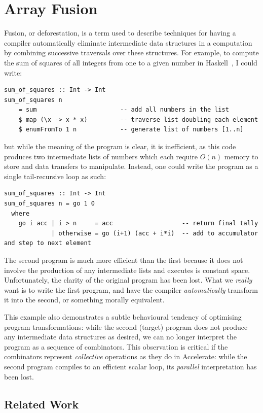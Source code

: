 \section{Array Fusion}
\label{sec:fusion}

Fusion, or deforestation, is a term used to describe techniques for having a
compiler automatically eliminate intermediate data structures in a computation
by combining successive traversals over these structures. For example, to
compute the sum of squares of all integers from one to a given number in
Haskell~\cite{Haskell:1998}, I could write:
%
\begin{lstlisting}[style=haskell]
sum_of_squares :: Int -> Int
sum_of_squares n
    = sum                       -- add all numbers in the list
    $ map (\x -> x * x)         -- traverse list doubling each element
    $ enumFromTo 1 n            -- generate list of numbers [1..n]
\end{lstlisting}
%
but while the meaning of the program is clear, it is inefficient, as this code
produces two intermediate lists of numbers which each require $O(n)$ memory to
store and data transfers to manipulate. Instead, one could write the program
as a single tail-recursive loop as such:
%
\begin{lstlisting}[style=haskell]
sum_of_squares :: Int -> Int
sum_of_squares n = go 1 0
  where
    go i acc | i > n     = acc                   -- return final tally
             | otherwise = go (i+1) (acc + i*i)  -- add to accumulator and step to next element
\end{lstlisting}
%
The second program is much more efficient than the first because it does not
involve the production of any intermediate lists and executes is constant space.
Unfortunately, the clarity of the original program has been lost. What we
\emph{really} want is to write the first program, and have the compiler
\emph{automatically} transform it into the second, or something morally
equivalent.

This example also demonstrates a subtle behavioural tendency of optimising
program transformations: while the second (target) program does not produce any
intermediate data structures as desired, we can no longer interpret the program
as a sequence of combinators. This observation is critical if the combinators
represent \emph{collective} operations as they do in Accelerate: while the
second program compiles to an efficient scalar loop, its \emph{parallel}
interpretation has been lost.


\subsection{Related Work}
\label{sec:fusion_related_work}

